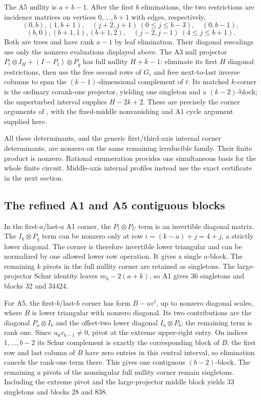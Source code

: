 The A5 nullity is $a+b-1$. After the first $b$ eliminations, the two
restrictions are incidence matrices on vertices $0,\ldots,b+1$ with
edges, respectively,
\[
 (0,b),(1,b+1),\quad(j+2,j+1)\ (0\le j\le b-3),\quad(0,b-1),
\]
\[
 (b,0),(b+1,1),(b+1,2),\quad(j-2,j-1)\ (4\le j\le b+1).
\]
Both are trees and have rank $a-1$ by leaf elimination. Their diagonal
rescalings use only the nonzero evaluations displayed above. The A3
null projector $P_t\otimes I_H+(I-P_t)\otimes P_q$ has full nullity
$H+k-1$: eliminate its first $H$ diagonal restrictions, then use the
free second rows of $G_i$ and free next-to-last inverse columns to
span the $(k-1)$-dimensional complement of $t$. Its matched $k$-corner
is the ordinary corank-one projector, yielding one singleton and a
$(k-2)$-block; the unperturbed interval supplies $H-2k+2$.
These are precisely the corner arguments of
, with the fixed-middle
nonvanishing and A1 cycle argument supplied here.

All these determinants, and the generic first/third-axis internal
corner determinants, are nonzero on the same remaining irreducible
family. Their finite product is nonzero. Rational enumeration provides
one simultaneous basis for the whole finite circuit. Middle-axis
internal profiles instead use the exact certificate in the next section.

\subsection{The refined A1 and A5 contiguous blocks}
In the first-$a$/last-$a$ A1 corner, the $P_t\otimes P_U$ term is an
invertible diagonal matrix. The $I_k\otimes P_q$ term can be nonzero
only at row $i=(k-a)+j=4+j$, a strictly lower diagonal. The corner is
therefore invertible lower triangular and can be normalized by one
allowed lower row operation. It gives a single $a$-block. The remaining
$k$ pivots in the full nullity corner are retained as singletons.
The large-projector Schur identity leaves $m_b-2(a+k)$, so A1 gives
36 singletons and blocks 32 and 34424.

For A5, the first-$b$/last-$b$ corner has form $B-uv^t$, up to
nonzero diagonal scales, where $B$ is lower triangular with nonzero
diagonal. Its two contributions are the diagonal $P_a\otimes I_b$
and the offset-two lower diagonal $I_a\otimes P_b$; the remaining
term is rank one. Since $u_0v_{b-1}\ne0$, pivot at the extreme
upper-right entry. On indices $1,\ldots,b-2$ its Schur complement is
exactly the corresponding block of $B$: the first row and last column
of $B$ have zero entries in this central interval, so elimination
cancels the rank-one term there. This gives one contiguous $(b-2)$-block.
The remaining $a$ pivots of the nonsingular full nullity corner remain
singletons. Including the extreme pivot and the large-projector middle
block yields 33 singletons and blocks 28 and 838.

